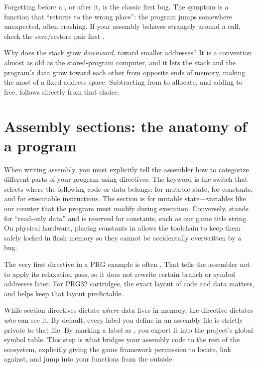 \begin{prgwarn}
Forgetting  before a , or  after it, is the
classic first bug. The symptom is a function that ``returns to the wrong place'':
the program jumps somewhere unexpected, often crashing. If your assembly behaves
strangely around a call, check the  save/restore pair first
\citep{prg32tutorialascii}.
\end{prgwarn}

\begin{prgaside}
Why does the stack grow \emph{downward}, toward smaller addresses? It is a
convention almost as old as the stored-program computer, and it lets the stack
and the program's data grow toward each other from opposite ends of memory,
making the most of a fixed address space. Subtracting from  to allocate,
and adding to free, follows directly from that choice.
\end{prgaside}

\section{Assembly sections: the anatomy of a program}

When writing assembly, you must explicitly tell the assembler how to categorize different 
parts of your program using directives. The  keyword is the switch that selects 
where the following code or data belongs:  for mutable state,  for constants, 
and  for executable instructions. The  section is for mutable state—variables 
like our counter that the program must modify during execution. Conversely,  stands for 
``read-only data'' and is reserved for constants, such as our game title string. On physical hardware, 
placing constants in  allows the toolchain to keep them safely locked in flash memory so 
they cannot be accidentally overwritten by a bug.

The very first directive in a PRG example is often . That tells the assembler 
not to apply its relaxation pass, so it does not rewrite certain branch or symbol addresses later. 
For PRG32 cartridges, the exact layout of code and data matters, and  helps keep 
that layout predictable.

While section directives dictate \emph{where} data lives in memory, the  directive 
dictates \emph{who} can see it. By default, every label you define in an assembly file is strictly 
private to that file. By marking a label as , you export it into the project's global 
symbol table. This step is what bridges your assembly code to the rest of the ecosystem, explicitly 
giving the game framework permission to locate, link against, and jump into your functions from the outside.

